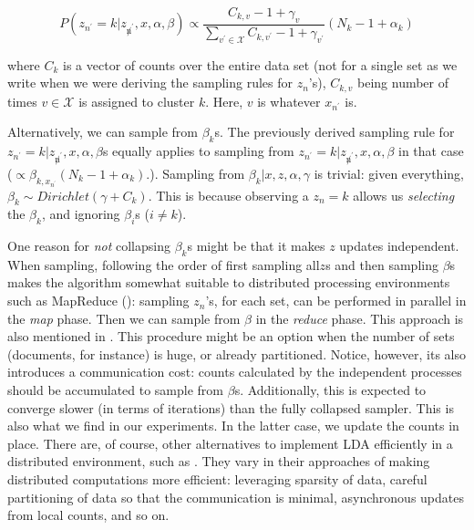 \documentclass{article}%
\begin{document}
\begin{equation*}
P(z_{n^\prime} = k|z_{\not n^\prime}, x, \alpha, \beta) \propto \frac{C_{k,v}  -1 + \gamma_{v}}{\sum_{ v^{\prime} \in \mathcal{X}}C_{k,v^{\prime}} - 1 + \gamma_{v^{\prime}}} (N_k - 1 + \alpha_k)
\end{equation*}

where $C_k$ is a vector of counts over the entire data set (not for a single set as we write when we were deriving the sampling rules for $z_n$'s), $C_{k,v}$ being number of times $v\in \mathcal{X}$ is assigned to cluster $k$. Here, $v$ is whatever $x_{n^\prime}$ is. 

Alternatively, we can sample from $\beta_k$s. The previously derived sampling rule for $z_{n^\prime} = k|z_{\not n^\prime}, x, \alpha, \beta$s equally applies to sampling from  $z_{n^\prime} = k|z_{\not n^\prime}, x, \alpha, \beta$ in that case ($ \propto \beta_{k, x_{n^\prime}} (N_k - 1 + \alpha_k).
$). Sampling from $\beta_k|x,z,\alpha,\gamma$ is trivial: given everything, $\beta_k \sim Dirichlet(\gamma + C_k)$. This is because observing a $z_n = k$ allows us \textit{selecting} the $\beta_k$, and ignoring $\beta_{i}$s ($i\neq k$). 

One reason for \textit{not} collapsing $\beta_k$s might be that it makes $z$ updates independent. When sampling, following the order of first sampling all$z$s and then sampling $\beta$s makes the algorithm somewhat suitable to distributed processing environments such as  MapReduce (\cite{dean2008mapreduce}): sampling $z_n$'s, for each set, can be performed in parallel in the \textit{map} phase. Then we can sample from $\beta$ in the \textit{reduce} phase. This approach is also mentioned in \cite{newman2009distributed}. This procedure might be an option when the number of sets (documents, for instance) is huge, or already partitioned. Notice, however, its also introduces a communication cost: counts calculated by the independent processes should be accumulated to sample from $\beta$s. Additionally, this is expected to converge slower (in terms of iterations) than the fully collapsed sampler. This is also what we find in our experiments. In the latter case, we update the counts in place. There are, of course, other alternatives to implement LDA efficiently in a distributed environment, such as \cite{newman2009distributed, smyth2009asynchronous}. They vary in their approaches of making distributed computations more efficient: leveraging sparsity of data, careful partitioning of data so that the communication is minimal,  asynchronous updates from local counts, and so on. 
\end{document}
